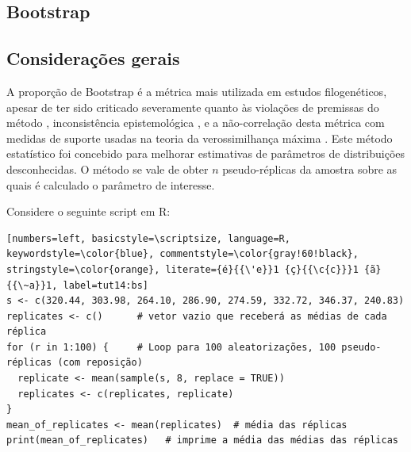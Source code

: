 \begin{refsection}
\section{Bootstrap}\label{tut14:boots}

\subsection{Considerações gerais}\label{tut14:boots:general}

A proporção de Bootstrap é a métrica mais utilizada em estudos filogenéticos, apesar de ter sido criticado severamente quanto às violações de premissas do método \parencite[veja][; e referências citadas]{Siddall_2001, Wheeler_2012}, inconsistência epistemológica \parencite[][]{Wheeler_2012}, e a não-correlação desta métrica com medidas de suporte usadas na teoria da verossimilhança máxima \parencite{machado_et_al_2022}. Este método estatístico foi concebido para melhorar estimativas de parâmetros de distribuições desconhecidas. O método se vale de obter $n$ pseudo-réplicas da amostra sobre as quais é calculado o parâmetro de interesse. 

Considere o seguinte script em R:

\begin{lstlisting}[numbers=left, basicstyle=\scriptsize, language=R, keywordstyle=\color{blue}, commentstyle=\color{gray!60!black}, stringstyle=\color{orange}, literate={é}{{\'e}}1 {ç}{{\c{c}}}1 {ã}{{\~a}}1, label=tut14:bs]
s <- c(320.44, 303.98, 264.10, 286.90, 274.59, 332.72, 346.37, 240.83)
replicates <- c()      # vetor vazio que receberá as médias de cada réplica
for (r in 1:100) {     # Loop para 100 aleatorizações, 100 pseudo-réplicas (com reposição)
  replicate <- mean(sample(s, 8, replace = TRUE))
  replicates <- c(replicates, replicate)
}
mean_of_replicates <- mean(replicates)  # média das réplicas
print(mean_of_replicates)   # imprime a média das médias das réplicas
\end{lstlisting}



\end{refsection}
